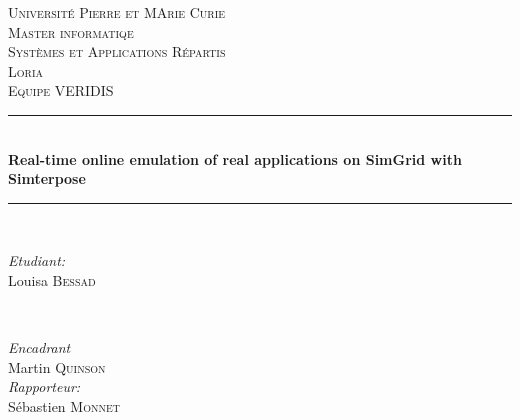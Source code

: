 \documentclass[a4paper,11pt]{article}
\begin{document}
\begin{titlepage}

\newcommand{\HRule}{\rule{\linewidth}{0.5mm}} %

\center %
 

\textsc{\LARGE Université Pierre et MArie Curie}\\[0.44cm] %
\textsc{\Large Master informatiqe}\\[0.44cm] %
\textsc{\large Systèmes et Applications Répartis}\\[1.44cm] %

\textsc{\LARGE Loria}\\[0.44cm] %
\textsc{\Large Equipe VERIDIS}\\[1.44cm] %


\HRule \\[0.4cm]
{ \huge \bfseries Real-time online emulation of real applications on SimGrid with Simterpose}\\[0.4cm] %
\HRule \\[1.44cm]
 

\begin{minipage}{0.4\textwidth}
\begin{flushleft} \large
\emph{Etudiant:}\\
Louisa \textsc{Bessad} %
\end{flushleft}
\end{minipage}
~
\begin{minipage}{0.4\textwidth}
\begin{flushright} \large
\emph{Encadrant} \\
Martin \textsc{Quinson} %
\\\vspace{1.44cm} \emph{Rapporteur:} \\ Sébastien
\textsc{Monnet}
\end{flushright}
\end{minipage}\\[1.5cm]


\end{titlepage}
\end{document}
